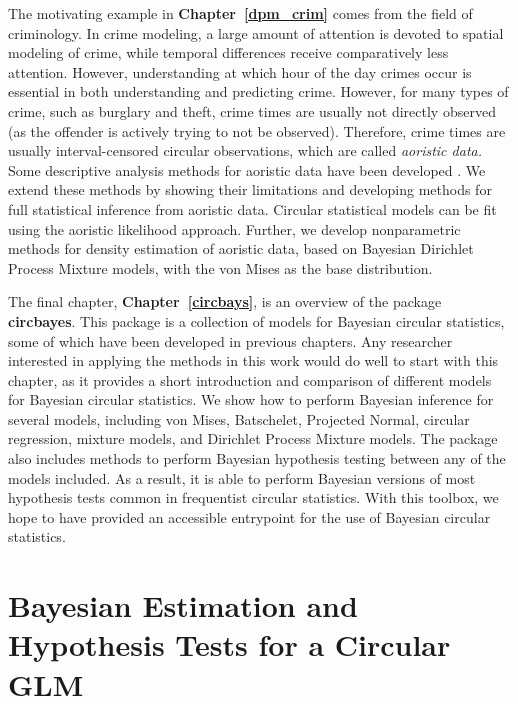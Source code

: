 \documentclass[12pt, a4paper]{book}\usepackage[]{graphicx}\usepackage[]{color}
\let\proglang=\textsf
\newcommand{\pkg}[1]{\textbf{#1}}
\begin{document}
The motivating example in \textbf{Chapter~\ref{dpm_crim}} comes from the field of criminology. In crime modeling, a large amount of attention is devoted to spatial modeling of crime, while temporal differences receive comparatively less attention. However, understanding at which hour of the day crimes occur is essential in both understanding and predicting crime. However, for many types of crime, such as burglary and theft, crime times are usually not directly observed (as the offender is actively trying to not be observed). Therefore, crime times are usually interval-censored circular observations, which are called \textit{aoristic data.} Some descriptive analysis methods for aoristic data have been developed \citep{ashby2013comparison}. We extend these methods by showing their limitations and developing methods for full statistical inference from aoristic data. Circular statistical models can be fit using the aoristic likelihood approach. Further, we develop nonparametric methods for density estimation of aoristic data, based on Bayesian Dirichlet Process Mixture models, with the von Mises as the base distribution.

The final chapter, \textbf{Chapter~\ref{circbays}}, is an overview of the package \pkg{circbayes}. This package is a collection of  models for Bayesian circular statistics, some of which have been developed in previous chapters. Any researcher interested in applying the methods in this work would do well to start with this chapter, as it provides a short introduction and comparison of different models for Bayesian circular statistics. We show how to perform Bayesian inference for several models, including von Mises, Batschelet, Projected Normal, circular regression, mixture models, and Dirichlet Process Mixture models. The package also includes methods to perform Bayesian hypothesis testing between any of the models included.
As a result, it is able to perform Bayesian versions of most hypothesis tests common in frequentist circular statistics. With this toolbox, we hope to have provided an accessible entrypoint for the use of Bayesian circular statistics.




\mainmatter
\chapter{Bayesian Estimation and Hypothesis Tests for a Circular GLM}
\label{circglm}
\end{document}

